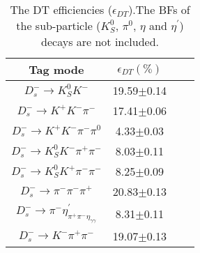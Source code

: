     \begin{table}[htbp]
        \caption{ The DT efficiencies ($\epsilon_{DT}$).The BFs of the sub-particle ($K_{S}^{0}$, $\pi^{0}$, $\eta$ and $\eta^{'}$) decays are not included.}
        \label{DT-eff}
        \begin{center}
            \begin{tabular}{cccc}
                \toprule\toprule
                Tag mode   & $\epsilon_{DT}(\%)$\\
                \hline
                $D_{s}^{-} \rightarrow K_{S}^{0}K^{-}$                                                   & 19.59$\pm$0.14\\
                $D_{s}^{-} \rightarrow K^{+}K^{-}\pi^{-}$                                                & 17.41$\pm$0.06\\
                $D_{s}^{-} \rightarrow K^{+}K^{-}\pi^{-}\pi^{0}$                                         &  4.33$\pm$0.03\\
                $D_{s}^{-} \rightarrow K_{S}^{0}K^{-}\pi^{+}\pi^{-}$                                     &  8.03$\pm$0.11\\
                $D_{s}^{-} \rightarrow K_{S}^{0}K^{+}\pi^{-}\pi^{-}$                                     &  8.25$\pm$0.09\\
                $D_{s}^{-} \rightarrow \pi^{-}\pi^{-}\pi^{+}$                                            & 20.83$\pm$0.13\\
                $D_{s}^{-} \rightarrow \pi^{-}\eta_{\pi^{+}\pi^{-}\eta_{\gamma\gamma}}^{'}$               &  8.31$\pm$0.11\\
                $D_{s}^{-} \rightarrow K^{-}\pi^{+}\pi^{-}$                                              & 19.07$\pm$0.13\\
                \bottomrule\bottomrule
            \end{tabular}
        \end{center}
    \end{table}

